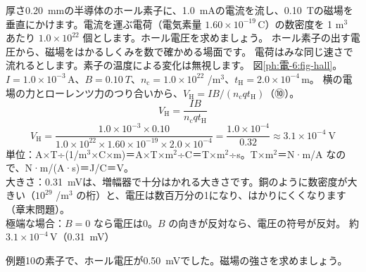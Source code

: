 \label{ph:電-6:ex10}
\begin{phreidai}[ホール素子で磁場をはかる]
厚さ\qty{0.20}{mm}の半導体のホール素子に、\qty{1.0}{mA}の電流を流し、\qty{0.10}{T}の磁場を垂直にかけます。電流を運ぶ電荷（電気素量 $1.60\times10^{-19}$\,C）の数密度を 1 m$^3$ あたり $1.0\times10^{22}$ 個とします。ホール電圧を求めましょう。
\phbamen
ホール素子の出す電圧から、磁場をはかるしくみを数で確かめる場面です。
\phmushi
電荷はみな同じ速さで流れるとします。素子の温度による変化は無視します。
\phzu
図\ref{ph:電-6:fig-hall}。$I=1.0\times10^{-3}$\,A、$B=\qty{0.10}{T}$、$n_{\mathrm c}=1.0\times10^{22}$ /m$^3$、$t_{\mathrm H}=2.0\times10^{-4}$\,m。
\phriyu
横の電場の力とローレンツ力のつり合いから、$V_{\mathrm H}=IB/(n_{\mathrm c}qt_{\mathrm H})$（⑩）。
\phtateru
\[V_{\mathrm H}=\frac{IB}{n_{\mathrm c}qt_{\mathrm H}}\]
\phtoku
\[V_{\mathrm H}=\frac{1.0\times10^{-3}\times0.10}{1.0\times10^{22}\times1.60\times10^{-19}\times2.0\times10^{-4}}=\frac{1.0\times10^{-4}}{0.32}\approx3.1\times10^{-4}\ \text{V}\]
\phtashikame
単位：A×T÷(1/m$^3$×C×m)＝A×T×m$^2$÷C＝T×m$^2$÷s。T×m$^2$＝N·m/A なので、N·m/(A·s)＝J/C＝V。\\
大きさ：\qty{0.31}{mV}は、増幅器で十分はかれる大きさです。銅のように数密度が大きい（$10^{29}$ /m$^3$ の桁）と、電圧は数百万分の1になり、はかりにくくなります（章末問題）。\\
極端な場合：$B=0$ なら電圧は0。$B$ の向きが反対なら、電圧の符号が反対。
\kotae 約 $3.1\times10^{-4}$\,V（\qty{0.31}{mV}）
\end{phreidai}
\begin{jibun}
例題10の素子で、ホール電圧が\qty{0.50}{mV}でした。磁場の強さを求めましょう。
\end{jibun}

